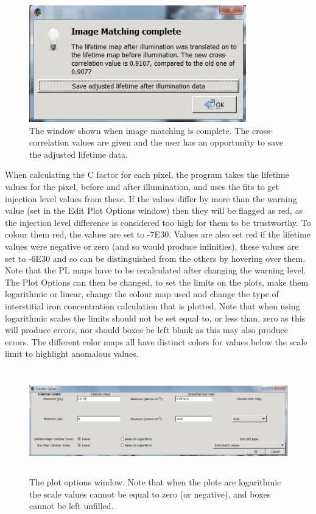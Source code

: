 \documentclass[final,a4paper,oneside,12pt]{article}
\begin{document}
\begin{figure}[h!]
\includegraphics[height=2in]{2imagematchingcomplete}
\caption{\label{figure2} The window shown when image matching is complete. The cross-correlation values are given and the user has an opportunity to save the adjusted lifetime data.}
\end{figure}


When calculating the C factor for each pixel, the program takes the lifetime values for the pixel, before and after illumination, and uses the fits to get injection level values from these. If the values differ by more than the warning value (set in the Edit Plot Options window) then they will be flagged as red, as the injection level difference is considered too high for them to be trustworthy. To colour them red, the values are set to -7E30. Values are also set red if the lifetime values were negative or zero (and so would produce infinities), these values are set to -6E30 and so can be distinguished from the others by hovering over them. Note that the PL maps have to be recalculated after changing the warning level.
\\
The Plot Options can then be changed, to set the limits on the plots, make them logarithmic or linear, change the colour map used and change the type of interstitial iron concentration calculation that is plotted. Note that when using logarithmic scales the limits should not be set equal to, or less than, zero as this will produce errors, nor should boxes be left blank as this may also produce errors. The different color maps all have distinct colors for values below the scale limit to highlight anomalous values.

\begin{figure}[h!]
\includegraphics[height=1.8in]{editcolorbar}
\caption{\label{figure2} The plot options window. Note that when the plots are logarithmic the scale values cannot be equal to zero (or negative), and boxes cannot be left unfilled.}
\end{figure}
\end{document}
